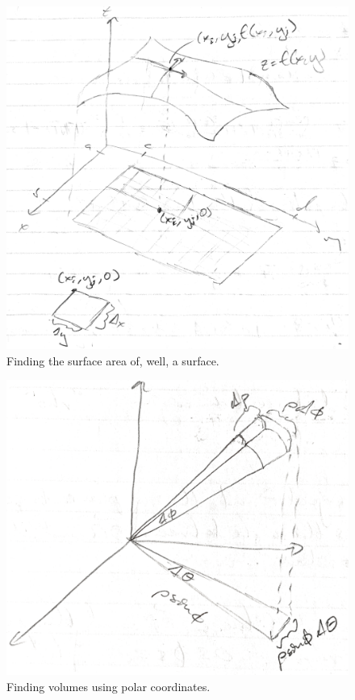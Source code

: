 \documentclass{article}[11pt]
\begin{document}
\begin{figure}[h]
    \includegraphics[width=\textwidth]{img3.PNG}
    \caption{Finding the surface area of, well, a surface.}
\end{figure}

\begin{figure}[h]
    \includegraphics[width=\textwidth]{img4.PNG}
    \caption{Finding volumes using polar coordinates.}
\end{figure}
\end{document}
